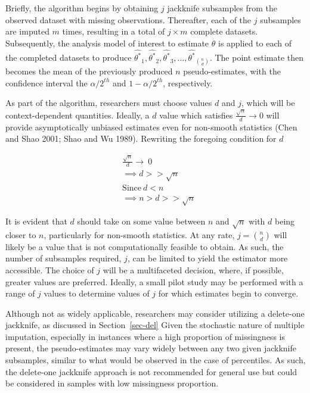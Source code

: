 \documentclass[
  letterpaper,
  DIV=11,
  numbers=noendperiod]{scrreprt}
\begin{document}
Briefly, the algorithm begins by obtaining \(j\) jackknife subsamples
from the observed dataset with missing observations. Thereafter, each of
the \(j\) subsamples are imputed \(m\) times, resulting in a total of
\(j \times m\) complete datasets. Subsequently, the analysis model of
interest to estimate \(\theta\) is applied to each of the completed
datasets to produce
\(\hat{\theta^*}_1, \hat{\theta^*}_2, \hat{\theta^*}_3, \dots, \hat{\theta^*}_{n \choose d}\).
The point estimate then becomes the mean of the previously produced
\(n\) pseudo-estimates, with the confidence interval the
\(\alpha/2^{th}\) and \(1-\alpha/2^{th}\), respectively.

As part of the algorithm, researchers must choose values \(d\) and
\(j\), which will be context-dependent quantities. Ideally, a \(d\)
value which satisfies \(\frac{\sqrt{n}}{d} \rightarrow 0\) will provide
asymptotically unbiased estimates even for non-smooth statistics (Chen
and Shao 2001; Shao and Wu 1989). Rewriting the foregoing condition for
\(d\)

\begin{align}
&\frac{\sqrt{n}}{d} \rightarrow \ 0 \\ 
&\implies d >> \sqrt{n} \\ 
&\text{Since} \ d < n \\
&\implies n > d >> \sqrt{n}
\end{align}

It is evident that \(d\) should take on some value between \(n\) and
\(\sqrt{n}\) with \(d\) being closer to \(n\), particularly for
non-smooth statistics. At any rate, \(j = \binom{n}{d}\) will likely be
a value that is not computationally feasible to obtain. As such, the
number of subsamples required, \(j\), can be limited to yield the
estimator more accessible. The choice of \(j\) will be a multifaceted
decision, where, if possible, greater values are preferred. Ideally, a
small pilot study may be performed with a range of \(j\) values to
determine values of \(j\) for which estimates begin to converge.

Although not as widely applicable, researchers may consider utilizing a
delete-one jackknife, as discussed in Section~\ref{sec-del} Given the
stochastic nature of multiple imputation, especially in instances where
a high proportion of missingness is present, the pseudo-estimates may
vary widely between any two given jackknife subsamples, similar to what
would be observed in the case of percentiles. As such, the delete-one
jackknife approach is not recommended for general use but could be
considered in samples with low missingness proportion.
\end{document}
